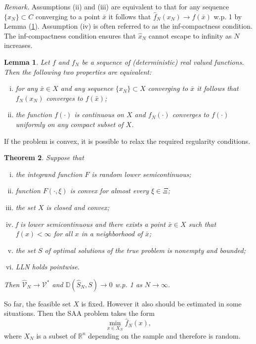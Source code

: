 \documentclass[a4pper,11pt]{article}
\newtheorem{thm}{Theorem}[section]
\newtheorem{lem}[thm]{Lemma}
\begin{document}
 \textit{Remark.} Assumptions (ii) and (iii) are equivalent to that for any sequence $\{x_N\}\subset C$ converging to a point $\bar x$ it follows that $\hat f_N(x_N)\to f(\bar x)$ w.p. 1 by Lemma (\ref{5.1}). Assumption (iv) is often referred to as the inf-compactness condition. The inf-compactness condition ensures that $\hat x_N$ cannot escape to infinity as $N$ increases.
  \begin{lem}
 Let $f$ and $f_N$ be a sequence of (deterministic) real valued functions. Then the following two properties are equivalent:
 \begin{enumerate}[(i)]
 	\item for any $\bar x\in X$ and any sequence $\{x_N\}\subset X$ converging to $\bar x$ it follows that $f_N(x_N)$ converges to $f(\bar x)$; 
	\item the function $f(\cdot)$ is continuous on $X$ and $f_N(\cdot)$ converges to $f(\cdot)$ uniformly on any compact subset of $X$.
 \end{enumerate}
 \label{5.1}
 \end{lem}
 If the problem is convex, it is possible to relax the required regularity conditions. 
 \begin{thm}
 Suppose that 
 \begin{enumerate}[(i)]
 	\item the integrand function $F$ is random lower semicontinuous;
	\item function $F(\cdot,\xi)$ is convex for almost every $\xi \in\Xi$;
	\item the set $X$ is closed and convex;
	\item f is lower semicontinuous and there exists a point $\bar x\in X$ such that $f(x)<\infty$ for all $x$ in a neighborhood of $\bar x$;
	\item the set $S$ of optimal solutions of the true problem is nonempty and bounded;
	\item LLN holds pointwise.
 \end{enumerate}
 Then  $\hat {\mathcal V}_N\to \mathcal V^*$ and $\mathbb D(\hat S_N,S)\to 0$ w.p. 1 as $N\to \infty$.
 \end{thm}
 So far, the feasible set $X$ is fixed. However it also should be estimated in some situations. Then the SAA problem takes the form
 $$
 \min_{x\in X_N}\hat f_N(x),
 $$
 where $X_N$ is a subset of $\mathbb R^n$ depending on the sample and therefore is random.
 
\end{document}
